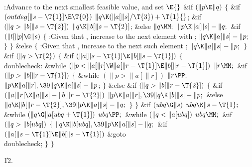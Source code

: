 \B{}:Advance  to the next smallest feasible
value, and set \X${}\E{}$\6
\&{if} ${}(\|p\E\|q){}$\5
${}\{{}$\1\6
\&{if} ${}(\\{outdeg}[\|s-\T{1}]\E\T{0}){}$\1\5
${}\|q\K(\|a[\|s]/\T{3})+\T{1}{}$;\2\6
\&{if} ${}(\|q>\|b[\|s-\T{2}]){}$\1\5
${}\|q\K\|b[\|s-\T{2}]{}$;\5
\2\&{else}\1\5
${}\|q\MM;{}$\2\6
${}\|p\K\|a[\|s]-\|q;{}$\6
\&{if} ${}(\|l[\|p]\G\|s){}$\5
${}\{{}$\1\6
:Given that , increase  to the next element
with \X;\6
${}\|q\K\|a[\|s]-\|p;{}$\6
\4${}\}{}$\2\6
\4${}\}{}$\5
\2\&{else}\5
${}\{{}$\1\6
:Given that , increase  to the next such element%
\X;\6
${}\|q\K\|a[\|s]-\|p;{}$\6
\4${}\}{}$\2\6
\&{if} ${}(\|q>\T{2}){}$\5
${}\{{}$\1\6
\&{if} ${}(\|a[\|s-\T{1}]\E\|b[\|s-\T{1}]){}$\5
${}\{{}$\1\6
\4\\{doublecheck}:\5
\&{while} ${}(\|p<\|a[\|r]\W\|a[\|r-\T{1}]\E\|b[\|r-\T{1}]){}$\1\5
${}\|r\MM;{}$\2\6
\&{if} ${}(\|p>\|b[\|r-\T{1}]){}$\5
${}\{{}$\1\6
\&{while} ${}(\|p>\|a[\|r]){}$\1\5
${}\|r\PP;{}$\2\6
${}\|p\K\|a[\|r],\39\|q\K\|a[\|s]-\|p{}$;\6
\4${}\}{}$\5
\2\&{else} \&{if} ${}(\|q>\|b[\|r-\T{2}]){}$\5
${}\{{}$\1\6
\&{if} ${}(\|a[\|r]\Z\|a[\|s]-\|b[\|r-\T{2}]){}$\1\5
${}\|p\K\|a[\|r],\39\|q\K\|b[\|s]-\|p;{}$\2\6
\&{else}\1\5
${}\|q\K\|b[\|r-\T{2}],\39\|p\K\|a[\|s]-\|q;{}$\2\6
\4${}\}{}$\2\6
\4${}\}{}$\2\6
\&{if} ${}(\\{ubq}\G\|s){}$\1\5
${}\\{ubq}\K\|s-\T{1};{}$\2\6
\&{while} ${}(\|q\G\|a[\\{ubq}+\T{1}]){}$\1\5
${}\\{ubq}\PP;{}$\2\6
\&{while} ${}(\|q<\|a[\\{ubq}]){}$\1\5
${}\\{ubq}\MM;{}$\2\6
\&{if} ${}(\|q>\|b[\\{ubq}]){}$\5
${}\{{}$\1\6
${}\|q\K\|b[\\{ubq}],\39\|p\K\|a[\|s]-\|q;{}$\6
\&{if} ${}(\|a[\|s-\T{1}]\E\|b[\|s-\T{1}]){}$\1\5
\&{goto} \\{doublecheck};\2\6
\4${}\}{}$\2\6
\4${}\}{}$\2\par
\U12.\fi

